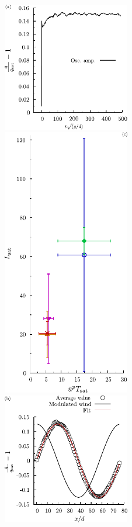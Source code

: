 \begin{figure}
    \centering
    \includegraphics[width=0.495\textwidth]{04-figuras/TMa-qamp.pdf}
    \includegraphics[width=0.495\textwidth]{04-figuras/TMc-Lsat.pdf}
    \includegraphics[width=0.495\textwidth]{04-figuras/TMb-qwind.pdf}

\end{figure}
